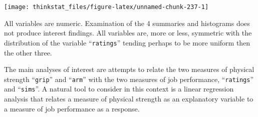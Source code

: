 \documentclass[]{krantz}
\makeatletter
\newenvironment{Shaded}{\begin{snugshade}}{\end{snugshade}}
\newcommand{\KeywordTok}[1]{\textcolor[rgb]{0.13,0.29,0.53}{\textbf{#1}}}
\newcommand{\DataTypeTok}[1]{\textcolor[rgb]{0.13,0.29,0.53}{#1}}
\newcommand{\DecValTok}[1]{\textcolor[rgb]{0.00,0.00,0.81}{#1}}
\newcommand{\CommentTok}[1]{\textcolor[rgb]{0.56,0.35,0.01}{\textit{#1}}}
\newcommand{\OperatorTok}[1]{\textcolor[rgb]{0.81,0.36,0.00}{\textbf{#1}}}
\newcommand{\NormalTok}[1]{#1}
\newenvironment{kframe}{%
\medskip{}
\setlength{\fboxsep}{.8em}
 \def\at@end@of@kframe{}%
 \ifinner\ifhmode%
  \def\at@end@of@kframe{\end{minipage}}%
  \begin{minipage}{\columnwidth}%
 \fi\fi%
 \def\FrameCommand##1{\hskip\@totalleftmargin \hskip-\fboxsep
 \colorbox{shadecolor}{##1}\hskip-\fboxsep
     \hskip-\linewidth \hskip-\@totalleftmargin \hskip\columnwidth}%
 \MakeFramed {\advance\hsize-\width
   \@totalleftmargin\z@ \linewidth\hsize
   \@setminipage}}%
 {\par\unskip\endMakeFramed%
 \at@end@of@kframe}
\renewenvironment{Shaded}{\begin{kframe}}{\end{kframe}}
\theoremstyle{definition}
\theoremstyle{definition}
\theoremstyle{definition}
\theoremstyle{remark}
\makeatother
\begin{document}
\begin{Shaded}
\end{Shaded}

\begin{center}\texttt{[image: thinkstat\_files/figure-latex/unnamed-chunk-237-1]} \end{center}

All variables are numeric. Examination of the 4 summaries and histograms
does not produce interest findings. All variables are, more or less,
symmetric with the distribution of the variable ``\texttt{ratings}''
tending perhaps to be more uniform then the other three.

The main analyses of interest are attempts to relate the two measures of
physical strength ``\texttt{grip}'' and ``\texttt{arm}'' with the two
measures of job performance, ``\texttt{ratings}'' and ``\texttt{sims}''.
A natural tool to consider in this context is a linear regression
analysis that relates a measure of physical strength as an explanatory
variable to a measure of job performance as a response.
\end{document}
